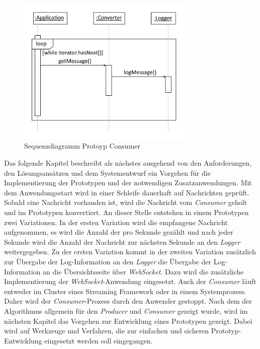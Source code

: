 \begin{figure}[htb!]
\centering
\includegraphics[width=0.75\textwidth]{bilder/sequenceConsumer.png}
\caption{Sequenzdiagramm Protoyp Consumer
\label{fig:seqConsumer}}
\end{figure}

Das folgende Kapitel beschreibt als nächstes ausgehend von den Anforderungen, den Lösungsansätzen und dem Systementwurf ein Vorgehen für die Implementierung der Prototypen und der notwendigen Zusatzanwendungen. Mit dem Anwendungsstart wird in einer Schleife dauerhaft auf Nachrichten geprüft. Sobald eine Nachricht vorhanden ist, wird die Nachricht vom \textit{Consumer} geholt und im Prototypen konvertiert. An dieser Stelle entstehen in einem Prototypen zwei Variationen. In der ersten Variation wird die empfangene Nachricht aufgenommen, es wird die Anzahl der pro Sekunde gezählt und nach jeder Sekunde wird die Anzahl der Nachricht zur nächsten Sekunde an den \textit{Logger} weitergegeben. Zu der ersten Variation kommt in der zweiten Variation zusätzlich zur Übergabe der Log-Information an den \textit{Logger} die Übergabe der Log-Information an die Übersichtsseite über \textit{WebSocket}. Dazu wird die zusätzliche Implementierung der \textit{WebSocket}-Anwendung eingesetzt. Auch der \textit{Consumer} läuft entweder im Cluster eines Streaming Framework oder in einem Systemprozess. Daher wird der \textit{Consumer}-Prozess durch den Anwender gestoppt. Nach dem der Algorithmus allgemein für den \textit{Producer} und \textit{Consumer} gezeigt wurde, wird im nächsten Kapitel das Vorgehen zur Entwicklung eines Prototypen gezeigt. Dabei wird auf Werkzeuge und Verfahren, die zur einfachen und sicheren Prototyp-Entwicklung eingesetzt werden soll eingegangen.


